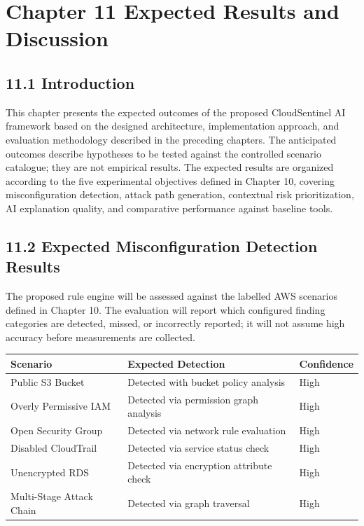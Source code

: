 \section{Chapter 11 Expected Results and Discussion}

\subsection{11.1 Introduction}

This chapter presents the expected outcomes of the proposed CloudSentinel AI framework based on the designed architecture, implementation approach, and evaluation methodology described in the preceding chapters. The anticipated outcomes describe hypotheses to be tested against the controlled scenario catalogue; they are not empirical results. The expected results are organized according to the five experimental objectives defined in Chapter 10, covering misconfiguration detection, attack path generation, contextual risk prioritization, AI explanation quality, and comparative performance against baseline tools.

\subsection{11.2 Expected Misconfiguration Detection Results}

The proposed rule engine will be assessed against the labelled AWS scenarios defined in Chapter 10. The evaluation will report which configured finding categories are detected, missed, or incorrectly reported; it will not assume high accuracy before measurements are collected.

\begin{longtable}[]{@{}lll@{}}
\toprule\noalign{}
Scenario & Expected Detection & Confidence \\
\midrule\noalign{}
\endhead
\bottomrule\noalign{}
\endlastfoot
Public S3 Bucket & Detected with bucket policy analysis & High \\
Overly Permissive IAM & Detected via permission graph analysis & High \\
Open Security Group & Detected via network rule evaluation & High \\
Disabled CloudTrail & Detected via service status check & High \\
Unencrypted RDS & Detected via encryption attribute check & High \\
Multi-Stage Attack Chain & Detected via graph traversal & High \\
\end{longtable}

